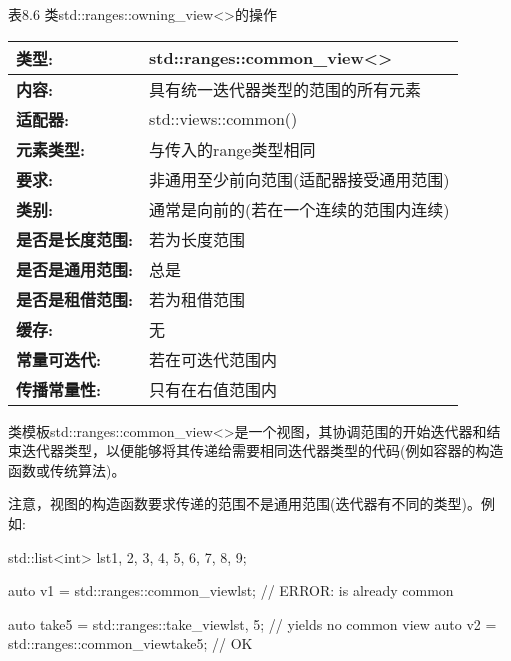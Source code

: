 \begin{center}
表8.6 类std::ranges::owning\_view<>的操作
\end{center}


\begin{longtable}[c]{|l|l|}
\hline
\textbf{类型:}     & std::ranges::common\_view\textless{}\textgreater{}                \\ \hline
\endfirsthead
%
\endhead
%
\textbf{内容:}  & 具有统一迭代器类型的范围的所有元素            \\ \hline
\textbf{适配器:}              & std::views::common()        \\ \hline
\textbf{元素类型:}         & 与传入的range类型相同 \\ \hline
\textbf{要求:} & 非通用至少前向范围(适配器接受通用范围) \\ \hline
\textbf{类别:} & 通常是向前的(若在一个连续的范围内连续)        \\ \hline
\textbf{是否是长度范围:}       & 若为长度范围           \\ \hline
\textbf{是否是通用范围:}      & 总是                      \\ \hline
\textbf{是否是租借范围:}   & 若为租借范围      \\ \hline
\textbf{缓存:}               & 无                     \\ \hline
\textbf{常量可迭代:}       & 若在可迭代范围内  \\ \hline
\textbf{传播常量性:} & 只有在右值范围内     \\ \hline
\end{longtable}

类模板std::ranges::common\_view<>是一个视图，其协调范围的开始迭代器和结束迭代器类型，以便能够将其传递给需要相同迭代器类型的代码(例如容器的构造函数或传统算法)。

注意，视图的构造函数要求传递的范围不是通用范围(迭代器有不同的类型)。例如:

\begin{cpp}
std::list<int> lst{1, 2, 3, 4, 5, 6, 7, 8, 9};

auto v1 = std::ranges::common_view{lst}; // ERROR: is already common

auto take5 = std::ranges::take_view{lst, 5}; // yields no common view
auto v2 = std::ranges::common_view{take5}; // OK
\end{cpp}

